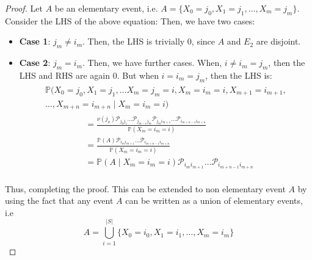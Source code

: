 \begin{proof}
    Let \(A\) be an elementary event, i.e. \(A = \{X_0 = j_0, X_1 = j_1, \dots , X_m = j_m\}\). Consider the LHS of the above equation:
    Then, we have two cases:
    \begin{itemize}
        \item \textbf{Case 1}: \(j_m \neq i_m\). Then, the LHS is trivially 0, since \(A\) and \(E_2\) are disjoint.
        \item \textbf{Case 2}: \(j_m = i_m\). Then, we have further cases. When, \( i \neq i_m = j_m\), then 
        the LHS and RHS are again 0. But when \(i = i_m = j_m\), then the LHS is: 
        \begin{multline*}
        \begin{aligned}
                \mathbb{P} (
                    X_0 = j_0, X_1 = j_1, \dots X_m = j_m = i ,X_m = i_m = i, X_{m+1} = i_{m+1},\\ \dots , X_{m+n} = i_{m+n} \mid X_m = i_m = i 
                    )
                \end{aligned}
            \end{multline*}
            \[
                \begin{aligned}
                    &= \frac{\nu(j_o) \mathcal{P}_{j_0 j_1} \dots \mathcal{P}_{j_{m-1} j_m} 
                    \mathcal{P}_{j_m i_{m+1}} \dots \mathcal{P}_{i_{m+n-1} i_{m+n}}}
                    {\mathbb{P} (X_m = i_m = i)} \\
                    &= \frac{\mathbb{P} (A) \mathcal{P}_{i_m i_{m+1}} \dots \mathcal{P}_{i_{m+n-1} i_{m+n}}}
                    {\mathbb{P} (X_m = i_m = i)} \\
                    &= \mathbb{P} (A \mid X_m = i_m = i) \mathcal{P}_{i_m i_{m+1}} \dots \mathcal{P}_{i_{m+n-1} i_{m+n}} \\
                \end{aligned}
            \]
            \end{itemize}
    Thus, completing the proof. This can be extended to non elementary event \(A\) by using the fact that
    any event \(A\) can be written as a union of elementary events, i.e
    \[
        A = \bigcup_{i=1}^{ |S| } \{X_0 = i_0, X_1 = i_1, \dots , X_m = i_m\}
    \]
\end{proof}

